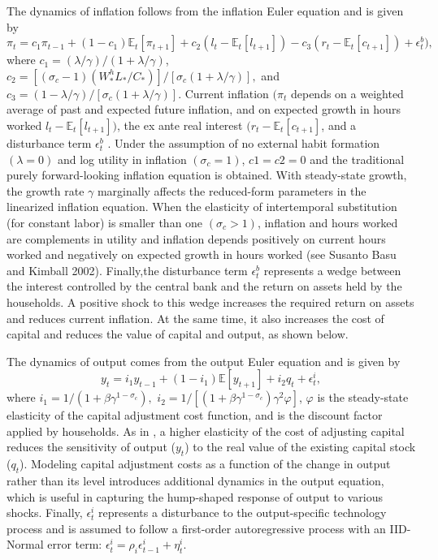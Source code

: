 \documentclass[11pt]{article}
\newcommand{\E}{\mathbb{E}}
\newcommand{\cobs}[1]{\pi_{#1}}
\newcommand{\iobs}[1]{y_{#1}}
\newcommand{\lobs}[1]{l_{#1}}
\newcommand{\robs}[1]{r_{#1}}
\newcommand{\piobs}[1]{c_{#1}}
\newcommand{\consumption}{inflation}
\newcommand{\investment}{output}
\newcommand{\hours}{hours worked}
\newcommand{\realinterest}{real interest}
\newcommand{\labor}{labor}
\newcommand{\interest}{interest}
\begin{document}
The dynamics of \consumption{} follows from the \consumption{} Euler
equation and is given by \begin{equation}
  \cobs{t} = c_1\cobs{t-1} + (1-c_1)\E_t[\cobs{t+1}] + c_2 (\lobs{t}
  -\E_t[\lobs{t+1}]) - c_3(\robs{t}-\E_t[\piobs{t+1}])+\epsilon_t^b),
\end{equation} where \(c_1 = (\lambda/\gamma)/(1+\lambda/\gamma)\),
\(c_2 = [(\sigma_c - 1)(W_*^h L_*/C_*)] / [\sigma_c(1+\lambda/\gamma)],\)
and \(c_3 = (1-\lambda/\gamma)/[\sigma_c(1+\lambda/\gamma)]\). Current
\consumption{} \((\cobs{t}\) depends on a weighted average of past and
expected future \consumption, and on expected growth in \hours{}
\(\lobs{t}  -\E_t[\lobs{t+1}])\), the ex ante \realinterest{}
\((\robs{t}-\E_t[\piobs{t+1}]\), and a disturbance term \(\epsilon^b_t\)
. Under the assumption of no external habit formation \((\lambda=0)\)
and log utility in \consumption{} \((\sigma_c =1)\), \(c1 = c2 = 0\) and
the traditional purely forward-looking \consumption{} equation is
obtained. With steady-state growth, the growth rate \(\gamma\)
marginally affects the reduced-form parameters in the linearized
\consumption{} equation. When the elasticity of intertemporal
substitution (for constant \labor) is smaller than one
\((\sigma_c > 1)\), \consumption{} and \hours{} are complements in
utility and \consumption{} depends positively on current \hours{} and
negatively on expected growth in \hours{} (see Susanto Basu and Kimball
2002). Finally,the disturbance term \(\epsilon_t^b\) represents a wedge
between the \interest{} controlled by the central bank and the return on
assets held by the households. A positive shock to this wedge increases
the required return on assets and reduces current \consumption. At the
same time, it also increases the cost of capital and reduces the value
of capital and \investment, as shown below.

The dynamics of \investment{} comes from the \investment{} Euler
equation and is given by \begin{equation}
  \iobs{t} = i_1\iobs{t-1} + (1-i_1)\E[\iobs{t+1}] + i_2 q_t + \epsilon_t^i,
\end{equation} where \(i_1 = 1/(1+\beta\gamma^{1-\sigma_c}),\)
\(i_2 = 1/[(1+\beta\gamma^{1-\sigma_c})\gamma^2\varphi]\), \(\varphi\)
is the steady-state elasticity of the capital adjustment cost function,
and is the discount factor applied by households. As in
\citet{ChristianoEichenbaum2005}, a higher elasticity of the cost of
adjusting capital reduces the sensitivity of \investment{}
(\(\iobs{t}\)) to the real value of the existing capital stock
(\(q_t\)). Modeling capital adjustment costs as a function of the change
in \investment{} rather than its level introduces additional dynamics in
the \investment{} equation, which is useful in capturing the hump-shaped
response of \investment{} to various shocks. Finally, \(\epsilon^i_t\)
represents a disturbance to the \investment-specific technology process
and is assumed to follow a first-order autoregressive process with an
IID-Normal error term:
\(\epsilon_t^i = \rho_i\epsilon_{t-1}^i + \eta_t^i\).
\end{document}

